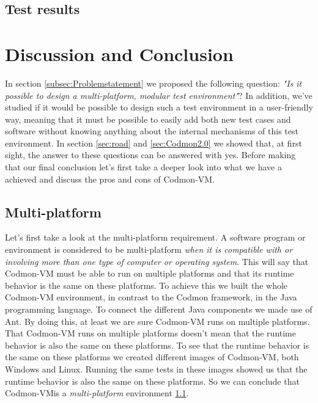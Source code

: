 \documentclass{article}
\newcommand{\project}{Codmon-VM}
\begin{document}
\subsection{Test results}
\label{test:results}


\newpage
\section{Discussion and Conclusion}
\label{sec:evaluation}
In section \ref{subsec:Problemstatement} we proposed the following question: \emph{"Is it possible to design a multi-platform, modular test environment"}? In addition, we've studied if it would be 
possible to design such a test environment in a user-friendly way, meaning that it must be possible to easily add both new test cases and software without knowing anything about the internal mechanisms of this test environment. 
In section \ref{sec:road} and \ref{sec:Codmon2.0} we showed that, at first sight, the answer to these questions can be answered with yes. Before making that our final conclusion let's first take a deeper look 
into what we have a achieved and discuss the pros and cons of \project{}. \\

\subsection{Multi-platform}
\label{dis:multi}
Let's first take a look at the multi-platform requirement. A software program or environment is considered to be multi-platform \emph{when it is compatible with or involving more than one type of computer or 
operating system}\cite{def:multi}. This will say that \project{} must be able to run on multiple platforms and that its runtime behavior is the same on these platforms. To achieve this we built the whole 
\project{} environment, in contrast to the Codmon framework, in the Java programming language. To connect the different Java components we made use of Ant. By doing this, at least we are sure \project{} 
runs on multiple platforms\cite{Java}.\\

\noindent That \project{} runs on multiple platforms doesn't mean that the runtime behavior is also the same on these platforms. To see that the runtime behavior is the same on these platforms we created 
different images of \project{}, both Windows and Linux. Running the same tests in these images showed us that the runtime behavior is also the same on these platforms. So we can conclude that \project is 
a \emph{multi-platform} environment \ref{dis:multi}.\\
\end{document}
